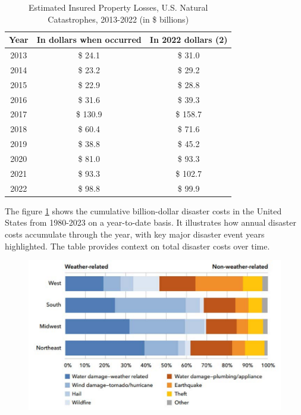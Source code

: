 \documentclass[12pt]{article}
\begin{document}
\begin{table}[h]
    \caption{Estimated Insured Property Losses, U.S. Natural Catastrophes, 2013-2022 (in \$ billions)}
    \label{tab:insured_prop_losses}
    \centering
    \begin{tabular}{|c|c|c|}
        \hline
        Year & In dollars when occurred & In 2022 dollars (2) \\
        \hline
        2013 & \$ 24.1 & \$ 31.0 \\
        2014 & \$ 23.2 & \$ 29.2 \\
        2015 & \$ 22.9 & \$ 28.8 \\
        2016 & \$ 31.6 & \$ 39.3 \\
        2017 & \$ 130.9 & \$ 158.7 \\
        2018 & \$ 60.4 & \$ 71.6 \\
        2019 & \$ 38.8 & \$ 45.2 \\
        2020 & \$ 81.0 & \$ 93.3 \\
        2021 & \$ 93.3 & \$ 102.7 \\
        2022 & \$ 98.8 & \$ 99.9 \\
        \hline
    \end{tabular}
    \cite{iii}
\end{table}    
  

The figure \ref{fig:disaster_threats} shows the cumulative billion-dollar disaster costs in the United States from 1980-2023 on a year-to-date basis. It 
illustrates how annual disaster costs accumulate through the year, with key major disaster event years highlighted. The table 
provides context on total disaster costs over time.

\begin{figure}[ht]
    \centering
    \label{fig:disaster_threats}
    \includegraphics[width=0.8\linewidth]{NAIC HO threats.pdf}
    \cite{naic}
\end{figure}
\end{document}
